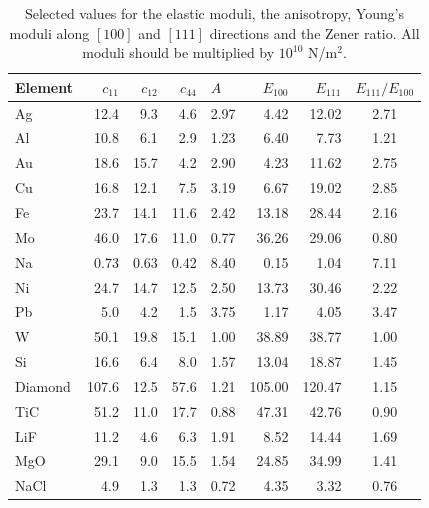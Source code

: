 \begin{table}[t]
\centering
\begin{tabular}{lrrrlrrc}
\hline
Element & $c_{11}$ & $c_{12}$ & $c_{44}$ & $A$ & $E_{100}$ & $E_{111}$ & $E_{111}/E_{100}$ \\
\hline
\hline
 Ag &   12.4&    9.3&    4.6&    2.97&    4.42&   12.02&    2.71\\
 Al &   10.8&    6.1&    2.9&    1.23&    6.40&    7.73&    1.21\\
 Au &   18.6&   15.7&    4.2&    2.90&    4.23&   11.62&    2.75\\
 Cu &   16.8&   12.1&    7.5&    3.19&    6.67&   19.02&    2.85\\
 Fe &   23.7&   14.1&   11.6&    2.42&   13.18&   28.44&    2.16\\
 Mo &   46.0&   17.6&   11.0&    0.77&   36.26&   29.06&    0.80\\
 Na &    0.73&    0.63&    0.42&    8.40&    0.15&    1.04&    7.11\\
 Ni &   24.7&   14.7&   12.5&    2.50&   13.73&   30.46&    2.22\\
 Pb &    5.0&    4.2&    1.5&    3.75&    1.17&    4.05&    3.47\\
 W  &   50.1&   19.8&   15.1&    1.00&   38.89&   38.77&    1.00\\
 \hline
 Si&              16.6&    6.4&    8.0&    1.57&   13.04&   18.87&    1.45\\
 Diamond&  107.6&   12.5&   57.6&    1.21&  105.00&  120.47&    1.15\\
 TiC&            51.2&   11.0&   17.7&    0.88&   47.31&   42.76&    0.90\\
\hline
 LiF&   11.2&    4.6&    6.3&    1.91&    8.52&   14.44&    1.69\\
 MgO&   29.1&    9.0&   15.5&    1.54&   24.85&   34.99&    1.41\\
 NaCl&    4.9&    1.3&    1.3&    0.72&    4.35&    3.32&    0.76\\
\hline
\end{tabular}
\caption{Selected values for the elastic moduli, the anisotropy, Young's moduli along $[100]$ and $[111]$
directions and the Zener ratio.  All moduli should be multiplied by $10^{10}$ N/m$^2$.}
\label{\chabbr:tb:moduli}
\end{table}

